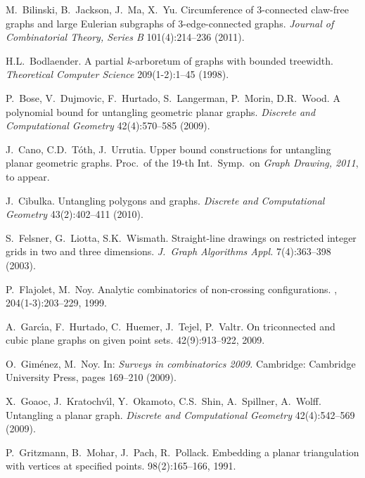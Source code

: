 \documentclass[reqno,12pt]{amsart}
\begin{document}
\begin{thebibliography}{10}


M.~Bilinski, B.~Jackson, J.~Ma, X.~Yu.
\newblock
Circumference of 3-connected claw-free graphs and large Eulerian subgraphs 
of 3-edge-connected graphs.
\newblock
{\em Journal of Combinatorial Theory, Series B} 101(4):214--236 (2011).


H.L.~Bodlaender.
\newblock
A partial $k$-arboretum of graphs with bounded treewidth.
\newblock
{\it Theoretical Computer Science} 209(1-2):1--45 (1998).


P.~Bose, V.~Dujmovic, F.~Hurtado, S.~Langerman, P.~Morin, D.R.~Wood.
\newblock
A polynomial bound for untangling geometric planar graphs. 
\newblock
{\em Discrete and Computational Geometry} 42(4):570--585 (2009).

J.~Cano, C.D.~T\'oth, J.~Urrutia.
\newblock
Upper bound constructions for untangling planar geometric graphs.
\newblock
Proc.\ of the 19-th Int.\ Symp.\ on {\em Graph Drawing, 2011},
to appear.

J.~Cibulka.
\newblock
Untangling polygons and graphs.
\newblock
{\em Discrete and Computational Geometry} 43(2):402--411 (2010).

S.~Felsner, G.~Liotta, S.K.~Wismath.
\newblock
Straight-line drawings on restricted integer grids in two and three dimensions. 
\newblock
{\em J.~Graph Algorithms Appl.} 7(4):363--398 (2003).


P.~Flajolet, M.~Noy.
\newblock Analytic combinatorics of non-crossing configurations.
, 204(1-3):203--229, 1999.

A.~Garc\'{\i}a, F.~Hurtado, C.~Huemer, J.~Tejel, P.~Valtr.
\newblock On triconnected and cubic plane graphs on given point sets.
 42(9):913--922, 2009.

O.~Gim\'enez, M.~Noy.
\newblock In: {\it Surveys in combinatorics 2009.}
Cambridge: Cambridge University Press, pages 169--210 (2009).

X.~Goaoc, J.~Kratochv\'{\i}l, Y.~Okamoto, C.S.~Shin, A.~Spillner, A.~Wolff.
\newblock
Untangling a planar graph.
\newblock
{\it Discrete and Computational Geometry\/} 42(4):542--569 (2009).

P.~Gritzmann, B.~Mohar, J.~Pach, R.~Pollack.
\newblock Embedding a planar triangulation with vertices at specified points.
 98(2):165--166, 1991.


\end{thebibliography}
\end{document}

